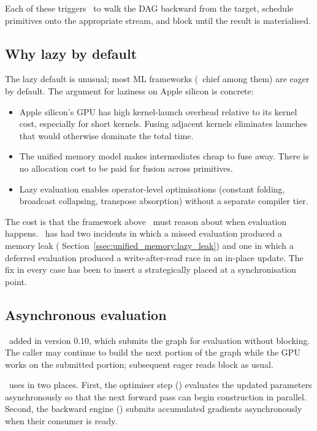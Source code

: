 Each of these triggers \MLX\ to walk the DAG backward from the
target, schedule primitives onto the appropriate stream, and block
until the result is materialised.

\subsection{Why lazy by default}
\label{ssec:mlx_runtime:lazy_why}

The lazy default is unusual; most ML frameworks (\
chief among them) are eager by default. The argument for laziness on
Apple silicon is concrete:

\begin{itemize}
  \item Apple silicon's GPU has high kernel-launch overhead relative
    to its kernel cost, especially for short kernels. Fusing adjacent
    kernels eliminates launches that would otherwise dominate the
    total time.
  \item The unified memory model makes intermediates cheap to fuse
    away. There is no allocation cost to be paid for fusion across
    primitives.
  \item Lazy evaluation enables operator-level optimisations
    (constant folding, broadcast collapsing, transpose absorption)
    without a separate compiler tier.
\end{itemize}

The cost is that the framework above \MLX\ must reason about when
evaluation happens. \Lucid\ has had two incidents in which a missed
evaluation produced a memory leak (\chref{ch:unified_memory}
Section~\ref{ssec:unified_memory:lazy_leak}) and one in which a
deferred evaluation produced a write-after-read race in an in-place
update. The fix in every case has been to insert a strategically
placed \code{eval} at a synchronisation point.

\subsection{Asynchronous evaluation}
\label{ssec:mlx_runtime:async_eval}

\MLX\ added  in version \(0.10\), which submits the
graph for evaluation without blocking. The caller may continue to
build the next portion of the graph while the GPU works on the
submitted portion; subsequent eager reads block as usual.

\Lucid\ uses  in two places. First, the optimiser
step (\chref{ch:optimizers}) evaluates the updated parameters
asynchronously so that the next forward pass can begin construction
in parallel. Second, the backward engine
() submits accumulated gradients
asynchronously when their consumer is ready.

